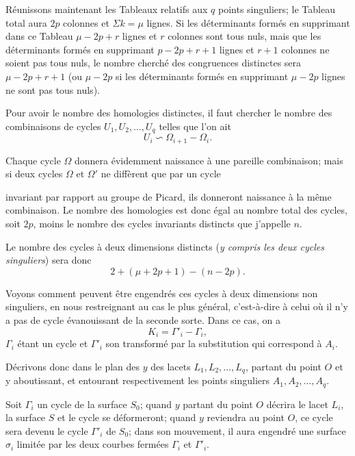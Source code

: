 \documentclass{article}
\begin{document}
Réunissons maintenant les Tableaux relatifs aux $q$ points singuliers; le Tableau total aura $2p$ colonnes et $\Sigma k = \mu$ lignes. Si les déterminants formés en supprimant dans ce Tableau $\mu - 2p + r$ lignes et $r$ colonnes sont tous nuls, mais que les déterminants formés en supprimant $p - 2p + r + 1$ lignes et $r + 1$ colonnes ne soient pas tous nuls, le nombre cherché des congruences distinctes sera $\mu - 2p + r + 1$ (ou $\mu - 2p$ si les déterminants formés en supprimant $\mu - 2p$ lignes ne sont pas tous nuls).

Pour avoir le nombre des homologies distinctes, il faut chercher le nombre des combinaisons de cycles $U_{1}, U_{2}, \ldots, U_{q}$ telles que l'on ait
\[ U_{i} \backsim \Omega_{i+1} - \Omega_{i}. \]

Chaque cycle $\Omega$ donnera évidemment naissance à une pareille combinaison; mais si deux cycles $\Omega$ et $\Omega'$ ne diffèrent que par un cycle

invariant par rapport au groupe de Picard, ils donneront naissance à la même combinaison. Le nombre des homologies est donc égal au nombre total des cycles, soit $2p$, moins le nombre des cycles invariants distincts que j'appelle $n$.

Le nombre des cycles à deux dimensions distincts (\emph{y compris les deux cycles singuliers}) sera donc
\[ 2 + (\mu + 2p + 1) - (n - 2p). \]

Voyons comment peuvent être engendrés ces cycles à deux dimensions non singuliers, en nous restreignant au cas le plus général, c'est-à-dire à celui où il n'y a pas de cycle évanouissant de la seconde sorte. Dans ce cas, on a
\[ K_{i} = \Gamma'_{i} - \Gamma_{i}, \]
$\Gamma_{i}$ étant un cycle et $\Gamma'_{i}$ son transformé par la substitution qui correspond à $A_{i}$.

Décrivons donc dans le plan des $y$ des lacets $L_{1}, L_{2}, \ldots, L_{q}$, partant du point $O$ et y aboutissant, et entourant respectivement les points singuliers $A_{1}, A_{2}, \ldots, A_{q}$.

Soit $\Gamma_{i}$ un cycle de la surface $S_{0}$; quand $y$ partant du point $O$ décrira le lacet $L_{i}$, la surface $S$ et le cycle se déformeront; quand $y$ reviendra au point $O$, ce cycle sera devenu le cycle $\Gamma'_{i}$ de $S_{0}$; dans son mouvement, il aura engendré une surface $\sigma_{i}$ limitée par les deux courbes fermées $\Gamma_{i}$ et $\Gamma'_{i}$.
\end{document}
